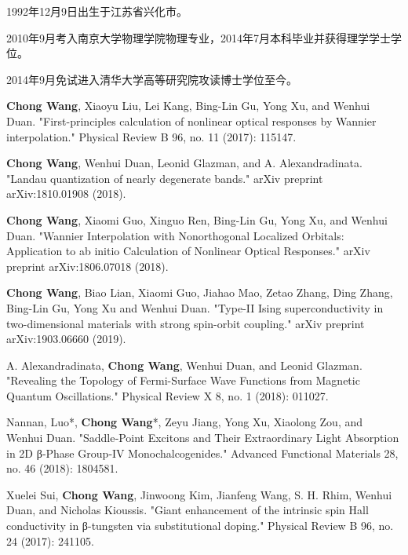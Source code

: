 \begin{resume}


  1992年12月9日出生于江苏省兴化市。

  2010年9月考入南京大学物理学院物理专业，2014年7月本科毕业并获得理学学士学位。

  2014年9月免试进入清华大学高等研究院攻读博士学位至今。


  \begin{publications}
    \item \textbf{Chong Wang}, Xiaoyu Liu, Lei Kang, Bing-Lin Gu, Yong Xu, and Wenhui Duan. "First-principles calculation of nonlinear optical responses by Wannier interpolation." Physical Review B 96, no. 11 (2017): 115147.

    \item \textbf{Chong Wang}, Wenhui Duan, Leonid Glazman, and A. Alexandradinata. "Landau quantization of nearly degenerate bands." arXiv preprint arXiv:1810.01908 (2018).

    \item \textbf{Chong Wang}, Xiaomi Guo, Xinguo Ren, Bing-Lin Gu, Yong Xu, and Wenhui Duan. "Wannier Interpolation with Nonorthogonal Localized Orbitals: Application to ab initio Calculation of Nonlinear Optical Responses." arXiv preprint arXiv:1806.07018 (2018).

    \item \textbf{Chong Wang}, Biao Lian, Xiaomi Guo, Jiahao Mao, Zetao Zhang, Ding Zhang, Bing-Lin Gu, Yong Xu and Wenhui Duan. "Type-II Ising superconductivity in two-dimensional materials with strong spin-orbit coupling." arXiv preprint arXiv:1903.06660 (2019).
 
    \item A. Alexandradinata, \textbf{Chong Wang}, Wenhui Duan, and Leonid Glazman. "Revealing the Topology of Fermi-Surface Wave Functions from Magnetic Quantum Oscillations." Physical Review X 8, no. 1 (2018): 011027.

    \item Nannan, Luo*, \textbf{Chong Wang}*, Zeyu Jiang, Yong Xu, Xiaolong Zou, and Wenhui Duan. "Saddle‐Point Excitons and Their Extraordinary Light Absorption in 2D β‐Phase Group‐IV Monochalcogenides." Advanced Functional Materials 28, no. 46 (2018): 1804581.
    
    \item Xuelei Sui, \textbf{Chong Wang}, Jinwoong Kim, Jianfeng Wang, S. H. Rhim, Wenhui Duan, and Nicholas Kioussis. "Giant enhancement of the intrinsic spin Hall conductivity in β-tungsten via substitutional doping." Physical Review B 96, no. 24 (2017): 241105.
    

\end{publications}
\end{resume}

